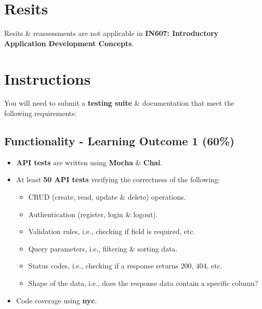 \documentclass{article}
\begin{document}
\section*{Resits}
Resits \& reassessments are not applicable in \textbf{IN607: Introductory Application Development Concepts}. 

\newpage

\section*{Instructions}
You will need to submit a \textbf{testing suite} \& documentation that meet the following requirements:

\subsection*{Functionality - Learning Outcome 1 (60\%)}
\begin{itemize}
    \item \textbf{API tests} are written using \textbf{Mocha} \& \textbf{Chai}.
    \item At least \textbf{50 API tests} verifying the correctness of the following:
          \begin{itemize}
            \item CRUD (create, read, update \& delete) operations.
            \item Authentication (register, login \& logout).
            \item Validation rules, i.e., checking if field is required, etc.
            \item Query parameters, i.e., filtering \& sorting data.
            \item Status codes, i.e., checking if a response returns 200, 404, etc.
            \item Shape of the data, i.e., does the response data contain a specific column?
          \end{itemize}
    \item Code coverage using \textbf{nyc}. 
\end{itemize}
\end{document}

